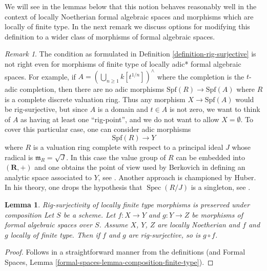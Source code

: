 \documentclass{stacks-project}
\newenvironment{slogan}{\comment}{\endcomment}
\theoremstyle{plain}
\newtheorem{lemma}[subsection]{Lemma}
\theoremstyle{definition}
\theoremstyle{remark}
\newtheorem{remark}[subsection]{Remark}
\numberwithin{equation}{subsection}
\def\Spec{\mathop{\mathrm{Spec}}}
\begin{document}
\noindent
We will see in the lemmas below that this notion behaves reasonably well
in the context of locally Noetherian formal algebraic spaces and morphisms
which are locally of finite type.
In the next remark we discuss options for modifying this definition
to a wider class of morphisms of formal algebraic spaces.

\begin{remark}
\label{remark-rig-surjective-more-general}
The condition as formulated in Definition \ref{definition-rig-surjective}
is not right even for morphisms of finite type
of locally adic* formal algebraic spaces.
For example, if $A = (\bigcup_{n \geq 1} k[t^{1/n}])^\wedge$
where the completion is the $t$-adic completion, then
there are no adic morphisms $\text{Spf}(R) \to \text{Spf}(A)$
where $R$ is a complete discrete valuation ring.
Thus any morphism $X \to \text{Spf}(A)$ would be rig-surjective,
but since $A$ is a domain and $t \in A$ is not zero, we want to
think of $A$ as having at least one ``rig-point'', and we do not
want to allow $X = \emptyset$. To cover this
particular case, one can consider adic morphisms
$$
\text{Spf}(R) \longrightarrow Y
$$
where $R$ is a valuation ring complete with respect to a principal
ideal $J$ whose radical is $\mathfrak m_R = \sqrt{J}$.
In this case the value group of $R$ can be embedded into
$(\mathbf{R}, +)$ and one obtains the point of view used by
Berkovich in defining an analytic space associated to $Y$, see
\cite{Berkovich}. Another approach is championed by Huber. In his theory,
one drops the hypothesis that $\Spec(R/J)$ is a singleton, see
\cite{Huber-continuous-valuations}.
\end{remark}

\begin{lemma}
\label{lemma-composition-rig-surjective}
\begin{slogan}
Rig-surjectivity of locally finite type morphisms is preserved under
composition
\end{slogan}
Let $S$ be a scheme. Let $f : X \to Y$ and $g : Y \to Z$ be morphisms of formal
algebraic spaces over $S$. Assume $X$, $Y$, $Z$ are locally Noetherian and
$f$ and $g$ locally of finite type. Then if $f$ and $g$ are rig-surjective,
so is $g \circ f$.
\end{lemma}

\begin{proof}
Follows in a straightforward manner from the definitions
(and Formal Spaces, Lemma \ref{formal-spaces-lemma-composition-finite-type}).
\end{proof}
\end{document}
